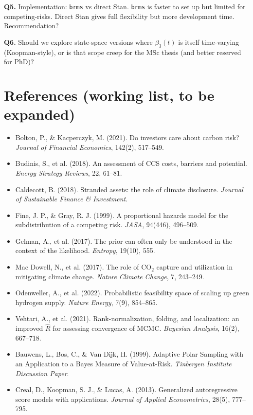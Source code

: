 \documentclass[11pt,a4paper]{article}
\begin{document}
\begin{openquestion}
\textbf{Q5.} Implementation: \texttt{brms} vs direct Stan. \texttt{brms} is faster to set up but limited for competing-risks. Direct Stan gives full flexibility but more development time. Recommendation?
\end{openquestion}

\begin{openquestion}
\textbf{Q6.} Should we explore state-space versions where $\beta_3(t)$ is itself time-varying (Koopman-style), or is that scope creep for the MSc thesis (and better reserved for PhD)?
\end{openquestion}

\section{References (working list, to be expanded)}

\begin{itemize}
  \item Bolton, P., \& Kacperczyk, M. (2021). Do investors care about carbon risk? \emph{Journal of Financial Economics}, 142(2), 517--549.
  \item Budinis, S., et al. (2018). An assessment of CCS costs, barriers and potential. \emph{Energy Strategy Reviews}, 22, 61--81.
  \item Caldecott, B. (2018). Stranded assets: the role of climate disclosure. \emph{Journal of Sustainable Finance \& Investment}.
  \item Fine, J. P., \& Gray, R. J. (1999). A proportional hazards model for the subdistribution of a competing risk. \emph{JASA}, 94(446), 496--509.
  \item Gelman, A., et al. (2017). The prior can often only be understood in the context of the likelihood. \emph{Entropy}, 19(10), 555.
  \item Mac Dowell, N., et al. (2017). The role of CO$_2$ capture and utilization in mitigating climate change. \emph{Nature Climate Change}, 7, 243--249.
  \item Odenweller, A., et al. (2022). Probabilistic feasibility space of scaling up green hydrogen supply. \emph{Nature Energy}, 7(9), 854--865.
  \item Vehtari, A., et al. (2021). Rank-normalization, folding, and localization: an improved $\hat{R}$ for assessing convergence of MCMC. \emph{Bayesian Analysis}, 16(2), 667--718.
  \item Bauwens, L., Bos, C., \& Van Dijk, H. (1999). Adaptive Polar Sampling with an Application to a Bayes Measure of Value-at-Risk. \emph{Tinbergen Institute Discussion Paper}.
  \item Creal, D., Koopman, S. J., \& Lucas, A. (2013). Generalized autoregressive score models with applications. \emph{Journal of Applied Econometrics}, 28(5), 777--795.
\end{itemize}
\end{document}
